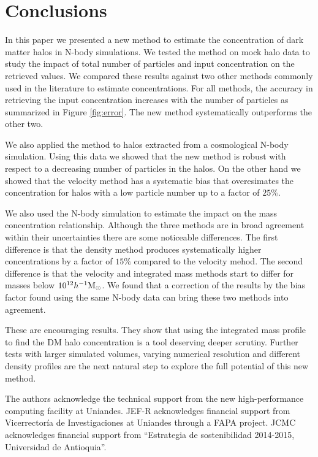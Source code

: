 \documentclass[a4,useAMS,usenatbib,usegraphicx]{mn2e}
\newcommand{\hMsun}{{\ifmmode{h^{-1}{\rm {M_{\odot}}}}\else{$h^{-1}{\rm{M_{\odot}}}$}\fi}}
\begin{document}
\section{Conclusions}
\label{sec:conclusions}

In this paper we presented a new method to estimate the concentration
of dark matter halos in N-body simulations.  
We tested the method on mock halo data to study the impact of total
number of particles and input concentration on the retrieved values.  
We compared these results against two other methods commonly used in
the literature to estimate concentrations.  
For all methods, the accuracy in retrieving the input concentration
increases with the number of particles as summarized in Figure
\ref{fig:error}.  The new method systematically outperforms the other two.

We also applied the method to halos extracted from a cosmological
N-body simulation.
Using this data we showed that the new method is robust with respect to a
decreasing number of particles in the halos. 
On the other hand we showed that the velocity method has a
systematic bias that overesimates the concentration for halos with a
low particle number up to a factor of $25\%$.

We also used the N-body simulation to estimate the impact on the mass
concentration relationship. 
Although the three methods are in broad agreement within their
uncertainties there are some noticeable differences.
The first difference is that the density method produces
systematically higher concentrations by a factor of $15\%$ compared to
the velocity mehod.
The second difference is that the velocity and integrated mass methods
start to differ for masses below $10^{12}\hMsun$. 
We found that a correction of the results by the bias factor found
using the same N-body data can bring these two methods into
agreement. 


These are encouraging results. 
They show that using the integrated mass profile to find the DM halo
concentration is a tool deserving deeper scrutiny. 
Further tests with larger simulated volumes, varying numerical
resolution and different density profiles are the next natural step to
explore the full potential of this new method. 

\vspace{0.1cm}

 The authors acknowledge the technical support from the new
 high-performance computing facility at Uniandes. JEF-R acknowledges
 financial support from Vicerrector\'ia de Investigaciones at Uniandes
 through a FAPA project. JCMC acknowledges financial support from
 ``Estrategia de  sostenibilidad 2014-2015, Universidad de
 Antioquia''.    
\end{document}
